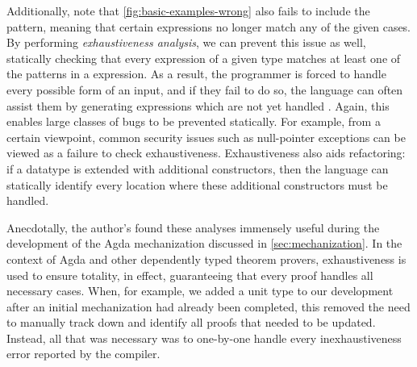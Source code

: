 Additionally, note that \autoref{fig:basic-examples-wrong} also fails to include the  pattern, meaning that certain expressions no longer match any of the given cases. By performing \emph{exhaustiveness analysis}, we can prevent this issue as well, statically checking that every expression of a given type matches at least one of the patterns in a  expression. As a result, the programmer is forced to handle every possible form of an input, and if they fail to do so, the language can often assist them by generating expressions which are not yet handled \cite{Harper2012}. Again, this enables large classes of bugs to be prevented statically. For example, from a certain viewpoint, common security issues such as null-pointer exceptions can be viewed as a failure to check exhaustiveness. Exhaustiveness also aids refactoring: if a datatype is extended with additional constructors, then the language can statically identify every location where these additional constructors must be handled. 

Anecdotally, the author's found these analyses immensely useful during the development of the Agda mechanization discussed in \autoref{sec:mechanization}. In the context of Agda and other dependently typed theorem provers, exhaustiveness is used to ensure totality, in effect, guaranteeing that every proof handles all necessary cases. When, for example, we added a unit type to our development after an initial mechanization had already been completed, this removed the need to manually track down and identify all proofs that needed to be updated. Instead, all that was necessary was to one-by-one handle every inexhaustiveness error reported by the compiler.